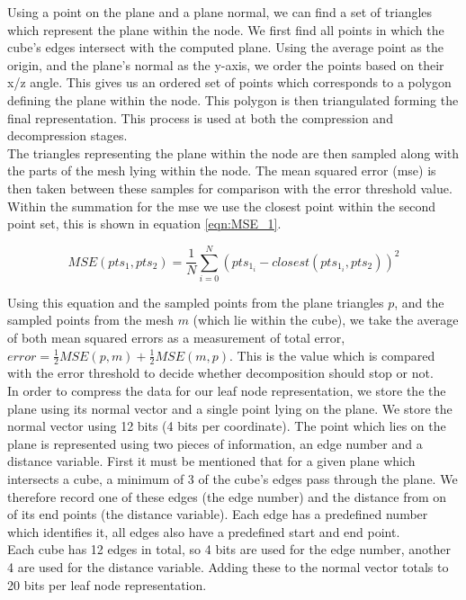 Using a point on the plane and a plane normal, we can find a set of triangles which represent the plane within the node. We first find all points in which the cube's edges intersect with the computed plane. Using the average point as the origin, and the plane's normal as the y-axis, we order the points based on their x/z angle. This gives us an ordered set of points which corresponds to a polygon defining the plane within the node. This polygon is then triangulated forming the final representation. This process is used at both the compression and decompression stages. \\

The triangles representing the plane within the node are then sampled along with the parts of the mesh lying within the node. The mean squared error (mse) is then taken between these samples for comparison with the error threshold value. Within the summation for the mse we use the closest point within the second point set, this is shown in equation \ref{eqn:MSE_1}.

\begin{equation}
 \label{eqn:MSE_1}
MSE(pts_1, pts_2) = \frac{1}{N}\sum_{i=0}^{N} (pts_{1_i} - closest(pts_{1_i}, pts_2))^2
\end{equation}

Using this equation and the sampled points from the plane triangles $p$, and the sampled points from the mesh $m$ (which lie within the cube), we take the average of both mean squared errors as a measurement of total error, $error = \frac{1}{2}MSE(p,m) + \frac{1}{2}MSE(m,p)$. This is the value which is compared with the error threshold to decide whether decomposition should stop or not. \\

In order to compress the data for our leaf node representation, we store the the plane using its normal vector and a single point lying on the plane. We store the normal vector using 12 bits (4 bits per coordinate). The point which lies on the plane is represented using two pieces of information, an edge number and a distance variable. First it must be mentioned that for a given plane which intersects a cube, a minimum of 3 of the cube's edges pass through the plane. We therefore record one of these edges (the edge number) and the distance from on of its end points (the distance variable). Each edge has a predefined number which identifies it, all edges also have a predefined start and end point. \\

Each cube has 12 edges in total, so 4 bits are used for the edge number, another 4 are used for the distance variable. Adding these to the normal vector totals to 20 bits per leaf node representation.  \\


